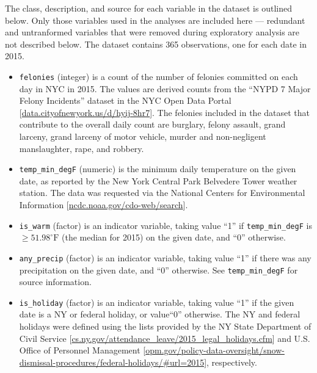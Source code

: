 \documentclass[11pt,notitlepage]{article}
\newcommand{\degf}{^\circ\text{F}}
\begin{document}
The class, description, and source for each variable in the dataset is outlined below. Only those variables used in the analyses are included here --- redundant and untranformed variables that were removed during exploratory analysis are not described below. The dataset contains 365 observations, one for each date in 2015.

\begin{itemize}
\setlength\itemsep{-1pt}

\item \texttt{felonies} (integer) is a count of the number of felonies committed on each day in NYC in 2015. The values are derived counts from the ``NYPD 7 Major Felony Incidents'' dataset in the NYC Open Data Portal [\href{https://data.cityofnewyork.us/Public-Safety/NYPD-7-Major-Felony-Incidents/hyij-8hr7}{data.cityofnewyork.us/d/hyij-8hr7}]. The felonies included in the dataset that contribute to the overall daily count are burglary, felony assault, grand larceny, grand larceny of motor vehicle, murder and non-negligent manslaughter, rape, and robbery.

\item \texttt{temp_min_degF} (numeric) is the minimum daily temperature on the given date, as reported by the New York Central Park Belvedere Tower weather station. The data was requested via the National Centers for Environmental Information [\href{http://www.ncdc.noaa.gov/cdo-web/search}{ncdc.noaa.gov/cdo-web/search}].

\item \texttt{is_warm} (factor) is an indicator variable, taking value ``1'' if \texttt{temp_min_degF} is $\geq 51.98 \degf$ (the median for 2015) on the given date, and ``0'' otherwise.

\item \texttt{any_precip} (factor) is an indicator variable, taking value ``1'' if there was any precipitation on the given date, and ``0'' otherwise. See \texttt{temp_min_degF} for source information.


\item \texttt{is_holiday} (factor) is an indicator variable, taking value ``1'' if the given date is a NY or federal holiday, or value``0'' otherwise. The NY and federal holidays were defined using the lists provided by the NY State Department of Civil Service [\href{https://www.cs.ny.gov/attendance_leave/2015_legal_holidays.cfm}{cs.ny.gov/attendance_leave/2015_legal_holidays.cfm}] and U.S. Office of Personnel Management [\href{https://www.opm.gov/policy-data-oversight/snow-dismissal-procedures/federal-holidays/\#url=2015}{opm.gov/policy-data-oversight/snow-dismissal-procedures/federal-holidays/\#url=2015}], respectively.



\end{itemize}
\end{document}
